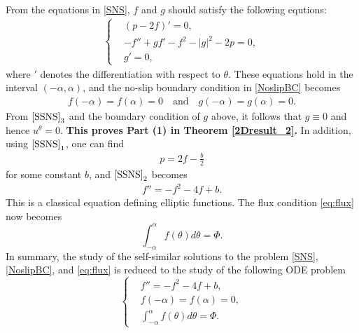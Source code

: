 \documentclass[reqno,12pt]{amsart}
\newcommand{\red}{\color{red}}
\begin{document}
From the equations in \eqref{SNS}, $f$ and $g$ should satisfy the following  equtions:
    \begin{align}
    \label{SSNS}
    \left\{
    \begin{aligned}
        &(p-2f)'=0,
        \\
        &-f''+gf'-f^2 -|g|^2-2p=0,
        \\
        &g'=0,
    \end{aligned}
    \right.
    \end{align}
where $'$ denotes the differentiation with respect to $\theta$.  
These equations hold in the interval $(-\alpha,\alpha)$, and the no-slip boundary condition in \eqref{NoslipBC} becomes
    \begin{align*}
        f(-\alpha)=f(\alpha)=0
        \quad \text{and}\quad 
        g(-\alpha)=g(\alpha)=0.
        \label{BC3}
    \end{align*}
From  $\eqref{SSNS}_3$ and the boundary condition of $g$ above, it follows that $g\equiv 0$ and hence $u^\theta=0$. {\bf This proves Part (1) in Theorem \ref{2Dresult_2}.} In addition, using $\eqref{SSNS}_1$, one can find
    \begin{align*}
        p=2f-\frac{b}{2}
    \end{align*} 
    for some constant $b$,
and $\eqref{SSNS}_2$ becomes
    \begin{align*}
        f''=-f^2 -4f+b.
    \end{align*}
This is a classical equation defining elliptic functions. 
 The flux condition \eqref{eq:flux} now becomes 
 \begin{equation*}
      \int_{-\alpha}^{\alpha} f(\theta) d \theta = \Phi.
 \end{equation*}
In summary, the study of the self-similar solutions to the  problem \eqref{SNS}, \eqref{NoslipBC}, and \eqref{eq:flux} is reduced to the study of the following ODE problem
\begin{equation}\label{eq:ODEsys}
\left\{
\begin{aligned}
&f''=-f^2 -4f+b,\\
&f(-\alpha)=f(\alpha)=0,\\
   &  \int_{-\alpha}^{\alpha} f(\theta) d \theta = \Phi.
\end{aligned}
\right.
 \end{equation}
\end{document}
